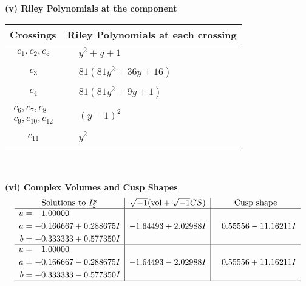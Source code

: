 \documentclass[1p]{elsarticle_modified}
\theoremstyle{definition}
\newcommand{\I}{\sqrt{-1}}
\begin{document}
\newpage\renewcommand{\arraystretch}{1}
\flushleft \textbf{(v) Riley Polynomials at the component}\newline \\
\begin{tabular}{m{50pt}|m{274pt}}
Crossings & \hspace{64pt}Riley Polynomials at each crossing \\
\hline $$\begin{aligned}c_{1},c_{2},c_{5}\end{aligned}$$&$\begin{aligned}
&y^2+y+1
\end{aligned}$\\
\hline $$\begin{aligned}c_{3}\end{aligned}$$&$\begin{aligned}
&81(81 y^2+36 y+16)
\end{aligned}$\\
\hline $$\begin{aligned}c_{4}\end{aligned}$$&$\begin{aligned}
&81(81 y^2+9 y+1)
\end{aligned}$\\
\hline $$\begin{aligned}c_{6},c_{7},c_{8}\\c_{9},c_{10},c_{12}\end{aligned}$$&$\begin{aligned}
&(y-1)^2
\end{aligned}$\\
\hline $$\begin{aligned}c_{11}\end{aligned}$$&$\begin{aligned}
&y^2
\end{aligned}$\\
\hline
\end{tabular}\\~\\
\newpage\flushleft \textbf{(vi) Complex Volumes and Cusp Shapes}
$$\begin{array}{c|c|c}  
\text{Solutions to }I^u_{2}& \I (\text{vol} + \sqrt{-1}CS) & \text{Cusp shape}\\
 \hline 
\begin{aligned}
u &= \phantom{-}1.00000\phantom{ +0.000000I} \\
a &= -0.166667 + 0.288675 I \\
b &= -0.333333 + 0.577350 I\end{aligned}
 & -1.64493 + 2.02988 I & \phantom{-}0.55556 - 11.16211 I \\ \hline\begin{aligned}
u &= \phantom{-}1.00000\phantom{ +0.000000I} \\
a &= -0.166667 - 0.288675 I \\
b &= -0.333333 - 0.577350 I\end{aligned}
 & -1.64493 - 2.02988 I & \phantom{-}0.55556 + 11.16211 I\\
 \hline 
 \end{array}$$\newpage
\end{document}
